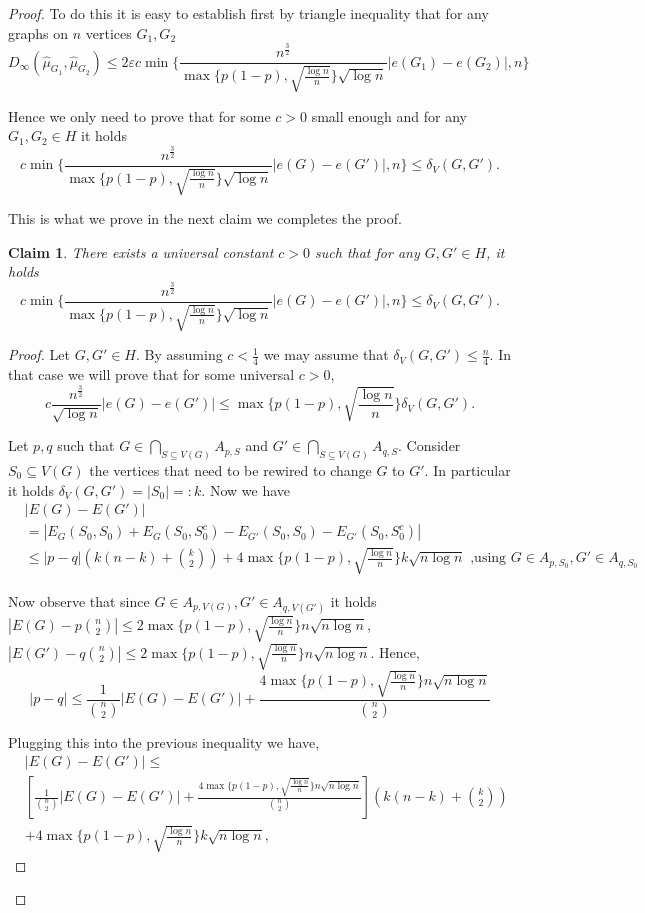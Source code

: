 \documentclass[12pt,a4paper]{article}
\numberwithin{equation}{section}
\newtheorem{claim}[theorem]{Claim}
\numberwithin{equation}{section}
\renewcommand{\epsilon}{\varepsilon}
\newcommand{\1}{{\text{\Large $\mathfrak 1$}}}
\newcommand{\2}[1]{{\text{\Large $\mathfrak 1$}\!\left(#1\right)}}
\begin{document}
\begin{proof}
To do this it is easy to establish first by triangle inequality that for any graphs on $n$ vertices $G_1,G_2$ $$D_{\infty} \left( \hat{\mu}_{G_1},\hat{\mu}_{G_2} \right) \leq 2\epsilon c \min \{\frac{n^{\frac{3}{2}}}{\max\{p(1-p),\sqrt{\frac{\log n}{n}}\}\sqrt{\log n}} |e(G_1)-e(G_2)|,n\} $$

Hence we only need to prove that for some $c>0$ small enough and for any $G_1,G_2 \in H$ it holds $$c\min\{ \frac{n^{\frac{3}{2}}}{\max\{p(1-p),\sqrt{\frac{\log n}{n}}\}\sqrt{\log n}}|e(G)-e(G')|,n\} \leq \delta_V(G,G').$$ 

This is what we prove in the next claim we completes the proof.

\begin{claim}
There exists a universal constant $c>0$ such that for any $G,G' \in H$, it holds $$c\min\{ \frac{n^{\frac{3}{2}}}{\max\{p(1-p),\sqrt{\frac{\log n}{n}}\} \sqrt{\log n}}|e(G)-e(G')|,n\} \leq \delta_V(G,G').$$ 
\end{claim}

\begin{proof}
Let $G,G' \in H$. By assuming $c<\frac{1}{4}$ we may assume that $\delta_V(G,G') \leq \frac{n}{4}$. In that case we will prove that for some universal $c>0$, $$c\frac{n^{\frac{3}{2}}}{\sqrt{\log n}}|e(G)-e(G')| \leq  \max\{p(1-p),\sqrt{\frac{\log n}{n}}\} \delta_V(G,G').$$ 

Let $p,q$ such that $G \in \bigcap_{S \subseteq V(G)} A_{p,S}$ and $G'\in \bigcap_{S \subseteq V(G)} A_{q,S}$.
Consider $S_0 \subseteq V(G)$ the vertices that need to be rewired to change $G$ to $G'$. In particular it holds $\delta_V(G,G')=|S_0|=:k$.
Now we have
\begin{align*}
& |E(G)-E(G')|\\
&=|E_G(S_0,S_0)+E_G(S_0,S^c_0)-E_{G'}(S_0,S_0)-E_{G'}(S_0,S^c_0)|\\
& \leq |p-q| \left( k(n-k)+\binom{k}{2} \right) +4 \max\{p(1-p),\sqrt{\frac{\log n}{n}}\} k  \sqrt{n \log n} \text{ ,using  }  G \in A_{p,S_0}, G' \in A_{q,S_0}
\end{align*}

Now observe that since $G \in A_{p,V(G)}, G' \in A_{q,V(G')}$ it holds $|E(G)-p \binom{n}{2}| \leq 2 \max\{p(1-p),\sqrt{\frac{\log n}{n}}\} n \sqrt{n \log n}$, $|E(G')-q \binom{n}{2}| \leq 2 \max\{p(1-p),\sqrt{\frac{\log n}{n}}\} n \sqrt{n \log n}$. Hence, $$|p-q| \leq \frac{1}{\binom{n}{2}}|E(G)-E(G')|+\frac{4 \max\{p(1-p),\sqrt{\frac{\log n}{n}}\} n \sqrt{n \log n}}{\binom{n}{2}}$$

Plugging this into the previous inequality we have, \begin{align*}
&|E(G)-E(G')| \leq \\
&\left[\frac{1}{\binom{n}{2}}|E(G)-E(G')|+\frac{4 \max\{p(1-p),\sqrt{\frac{\log n}{n}}\} n \sqrt{n \log n}}{\binom{n}{2}}\right] \left( k(n-k)+\binom{k}{2} \right)\\
& +4\max\{p(1-p),\sqrt{\frac{\log n}{n}}\} k  \sqrt{n \log n},
\end{align*}




\end{proof}
\end{proof}
\end{document}

